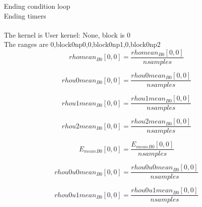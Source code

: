 \documentclass{article}
\begin{document}
\noindent Ending condition loop %
\\\noindent Ending timers\\
\\\noindent The kernel is User kernel: None, block is 0\\\noindent The ranges are 0,block0np0,0,block0np1,0,block0np2\\\begin{dmath}{rhomean{_{B0}}}[{0,0}] = \frac{{rhomean{_{B0}}}[{0,0}]}{nsamples}\end{dmath}

\begin{dmath}{rhou0mean{_{B0}}}[{0,0}] = \frac{{rhou0mean{_{B0}}}[{0,0}]}{nsamples}\end{dmath}

\begin{dmath}{rhou1mean{_{B0}}}[{0,0}] = \frac{{rhou1mean{_{B0}}}[{0,0}]}{nsamples}\end{dmath}

\begin{dmath}{rhou2mean{_{B0}}}[{0,0}] = \frac{{rhou2mean{_{B0}}}[{0,0}]}{nsamples}\end{dmath}

\begin{dmath}{E_{mean}{_{B0}}}[{0,0}] = \frac{{E_{mean}{_{B0}}}[{0,0}]}{nsamples}\end{dmath}

\begin{dmath}{rhou0u0mean{_{B0}}}[{0,0}] = \frac{{rhou0u0mean{_{B0}}}[{0,0}]}{nsamples}\end{dmath}

\begin{dmath}{rhou0u1mean{_{B0}}}[{0,0}] = \frac{{rhou0u1mean{_{B0}}}[{0,0}]}{nsamples}\end{dmath}
\end{document}
